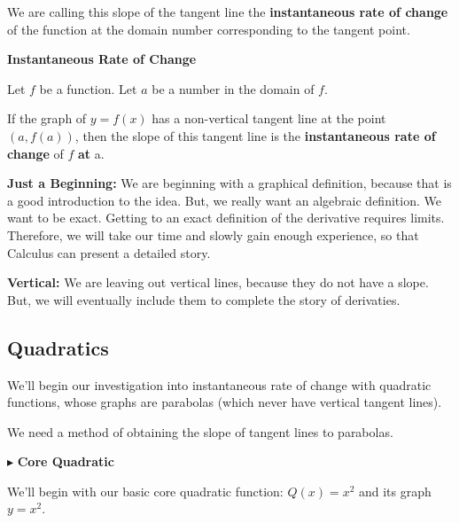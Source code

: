 \documentclass{ximera}
\begin{document}
We are calling this slope of the tangent line the \textbf{\textcolor{purple!85!blue}{instantaneous rate of change}} of the function at the domain number corresponding to the tangent point.




\begin{definition} \textbf{\textcolor{green!50!black}{Instantaneous Rate of Change}}  


Let $f$ be a function. Let $a$ be a number in the domain of $f$.

If the graph of $y = f(x)$ has a non-vertical tangent line at the point $(a, f(a))$, then the slope of this tangent line is the \textbf{instantaneous rate of change} of $f$ \textbf{at} a.


\end{definition}






\textbf{Just a Beginning:} We are beginning with a graphical definition, because that is a good introduction to the idea.  But, we really want an algebraic definition.  We want to be exact.  Getting to an exact definition of the derivative requires limits.  Therefore, we will take our time and slowly gain enough experience, so that Calculus can present a detailed story.

\textbf{Vertical:} We are leaving out vertical lines, because they do not have a slope.  But, we will eventually include them to complete the story of derivaties.








\subsection*{Quadratics}

We'll begin our investigation into instantaneous rate of change with quadratic functions, whose graphs are parabolas (which never have vertical tangent lines). 


We need a method of obtaining the slope of tangent lines to parabolas.







$\blacktriangleright$ \textbf{Core Quadratic}


We'll begin with our basic core quadratic function: \textbf{\textcolor{purple!85!blue}{$Q(x) = x^2$}} and its graph \textbf{\textcolor{purple!85!blue}{$y = x^2$}}. 
\end{document}
